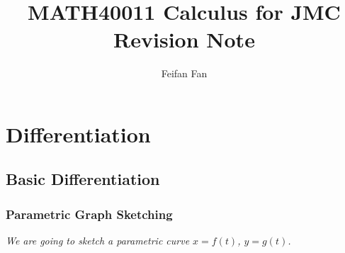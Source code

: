 \documentclass[12pt]{report}
\title{MATH40011 Calculus for JMC 
 \\ Revision Note}
\author{Feifan Fan}
\begin{document}
\maketitle

\chapter{Differentiation}

\section{Basic Differentiation}

\subsection{Parametric Graph Sketching}

\emph{We are going to sketch a parametric curve $x = f(t)$, $y = g(t)$.}
\newline
\end{document}
